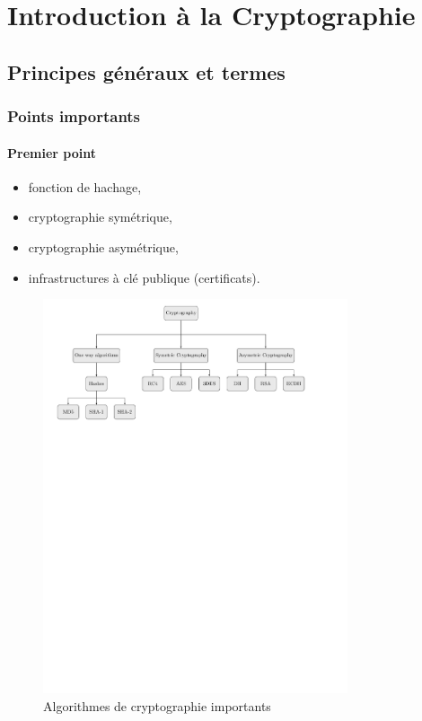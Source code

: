 \chapter{Introduction à la Cryptographie}
\section{Principes généraux et termes}
\subsection{Points importants}
\subsubsection{Premier point}


\begin{itemize}
	\item fonction de hachage,
	\item cryptographie symétrique,
	\item cryptographie asymétrique,
	\item infrastructures à clé publique (certificats).
\end{itemize}

\begin{figure}[h]
\centering
\includegraphics[trim= 0cm 19cm 3cm 0, clip,width=0.8\textwidth]{../figures/flowcharts/crypto_types.pdf}
\caption[Algorithmes de cryptographie importants]{Algorithmes de cryptographie importants}
\label{fig:crypto_algos}
\end{figure}
\FloatBarrier

